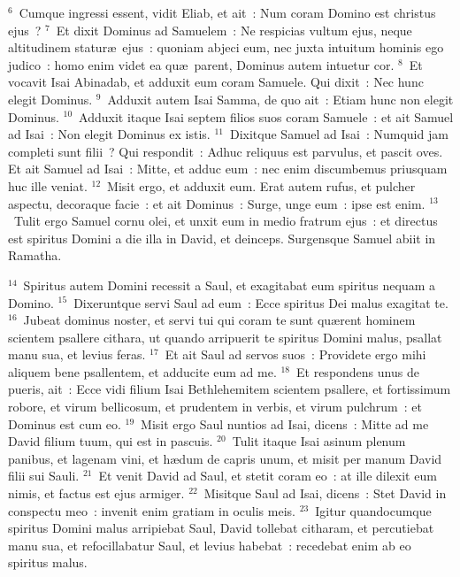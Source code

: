 ${}^{6}$~Cumque ingressi essent, vidit Eliab, et ait~: Num coram Domino est christus ejus~?
${}^{7}$~Et dixit Dominus ad Samuelem~: Ne respicias vultum ejus, neque altitudinem statur\ae\ ejus~: quoniam abjeci eum, nec juxta intuitum hominis ego judico~: homo enim videt ea qu\ae\ parent, Dominus autem intuetur cor.
${}^{8}$~Et vocavit Isai Abinadab, et adduxit eum coram Samuele. Qui dixit~: Nec hunc elegit Dominus.
${}^{9}$~Adduxit autem Isai Samma, de quo ait~: Etiam hunc non elegit Dominus.
${}^{10}$~Adduxit itaque Isai septem filios suos coram Samuele~: et ait Samuel ad Isai~: Non elegit Dominus ex istis.
${}^{11}$~Dixitque Samuel ad Isai~: Numquid jam completi sunt filii~? Qui respondit~: Adhuc reliquus est parvulus, et pascit oves. Et ait Samuel ad Isai~: Mitte, et adduc eum~: nec enim discumbemus priusquam huc ille veniat.
${}^{12}$~Misit ergo, et adduxit eum. Erat autem rufus, et pulcher aspectu, decoraque facie~: et ait Dominus~: Surge, unge eum~: ipse est enim.
${}^{13}$~Tulit ergo Samuel cornu olei, et unxit eum in medio fratrum ejus~: et directus est spiritus Domini a die illa in David, et deinceps. Surgensque Samuel abiit in Ramatha.


${}^{14}$~Spiritus autem Domini recessit a Saul, et exagitabat eum spiritus nequam a Domino.
${}^{15}$~Dixeruntque servi Saul ad eum~: Ecce spiritus Dei malus exagitat te.
${}^{16}$~Jubeat dominus noster, et servi tui qui coram te sunt qu\ae rent hominem scientem psallere cithara, ut quando arripuerit te spiritus Domini malus, psallat manu sua, et levius feras.
${}^{17}$~Et ait Saul ad servos suos~: Providete ergo mihi aliquem bene psallentem, et adducite eum ad me.
${}^{18}$~Et respondens unus de pueris, ait~: Ecce vidi filium Isai Bethlehemitem scientem psallere, et fortissimum robore, et virum bellicosum, et prudentem in verbis, et virum pulchrum~: et Dominus est cum eo.
${}^{19}$~Misit ergo Saul nuntios ad Isai, dicens~: Mitte ad me David filium tuum, qui est in pascuis.
${}^{20}$~Tulit itaque Isai asinum plenum panibus, et lagenam vini, et h\ae dum de capris unum, et misit per manum David filii sui Sauli.
${}^{21}$~Et venit David ad Saul, et stetit coram eo~: at ille dilexit eum nimis, et factus est ejus armiger.
${}^{22}$~Misitque Saul ad Isai, dicens~: Stet David in conspectu meo~: invenit enim gratiam in oculis meis.
${}^{23}$~Igitur quandocumque spiritus Domini malus arripiebat Saul, David tollebat citharam, et percutiebat manu sua, et refocillabatur Saul, et levius habebat~: recedebat enim ab eo spiritus malus.

